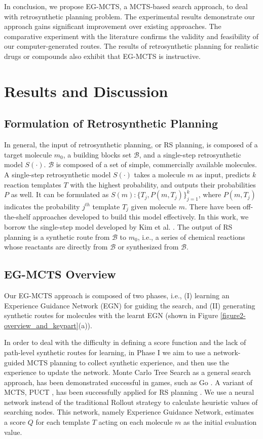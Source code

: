 \documentclass[sn-mathphys,Numbered]{sn-jnl}
\begin{document}
In conclusion, we propose EG-MCTS, a MCTS-based search approach, to deal with retrosynthetic planning problem. 
The experimental results demonstrate our approach gains significant improvement over existing approaches. 
The comparative experiment with the literature confirms the validity and feasibility of our computer-generated routes. 
The results of retrosynthetic planning for realistic drugs or compounds also exhibit that EG-MCTS is instructive.


\section{Results and Discussion }\label{sec2}

\subsection{Formulation of Retrosynthetic Planning }
In general, the input of retrosynthetic planning, or RS planning, is composed of a target molecule $m_0$, a building blocks set $\mathcal{B}$, and a single-step retrosynthetic model $S(\cdot)$. $\mathcal{B}$ is composed of a set of simple, commercially available molecules. A single-step retrosynthetic model $S(\cdot)$ takes a molecule $m$ as input, predicts $k$ reaction templates $T$ with the highest probability, and outputs their probabilities $P$ as well. It can be formulated as $S(m):\{T_j,P(m,T_j)\}_{j=1}^{k}$, where $P(m,T_j)$ indicates the probability $j^{th}$ template $T_j$ given molecule $m$. There have been off-the-shelf approaches \cite{Coley2017, segler2017, segler2018, retro2020} developed to build this model effectively. In this work, we borrow the single-step model developed by Kim et al. \cite{2022}. The output of RS planning is a synthetic route from $\mathcal{B}$ to $m_0$, i.e., a series of chemical reactions whose reactants are directly from $\mathcal{B}$ or synthesized from $\mathcal{B}$. 



\subsection{EG-MCTS Overview}
Our EG-MCTS approach is composed of two phases, i.e., (I) learning an Experience Guidance Network (EGN) for guiding the search, and (II) generating synthetic routes for molecules with the learnt EGN (shown in Figure \ref{figure2-overview_and_keypart}(a)).

In order to deal with the difficulty in defining a score function and the lack of path-level synthetic routes for learning, in Phase I we aim to use a network-guided MCTS planning to collect synthetic experience, and then use the experience to update the network. Monte Carlo Tree Search \citep{MCTS2006} as a general search approach, has been demonstrated successful in games, such as Go \citep{alphago, alphago2, alphago3}. 
A variant of MCTS, PUCT \citep{puct2010}, has been successfully applied for RS planning \citep{segler2018}. We use a neural network instead of the traditional Rollout strategy to calculate heuristic values of searching nodes. This network, namely Experience Guidance Network, estimates a score $Q$ for each template $T$ acting on each molecule $m$ as the initial evaluation value.
\end{document}
